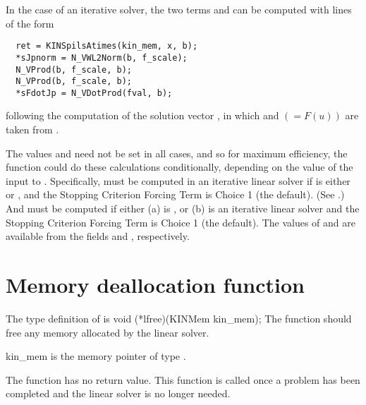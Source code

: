 In the case of an iterative solver, the two terms  and
 can be computed with lines of the form
\vspace{-.1in}
  \begin{verbatim}
  ret = KINSpilsAtimes(kin_mem, x, b);
  *sJpnorm = N_VWL2Norm(b, f_scale);
  N_VProd(b, f_scale, b);
  N_VProd(b, f_scale, b);
  *sFdotJp = N_VDotProd(fval, b);
  \end{verbatim}
\vspace{-.2in}
following the computation of the solution vector , in which
 and  $(= F(u))$ are taken from .

The values  and  need not be set in all cases,
and so for maximum efficiency, the  function could do these
calculations conditionally, depending on the value of the input 
to .  Specifically,  must be computed in an
iterative linear solver if  is either  or
, and the Stopping Criterion Forcing Term is Choice 1
(the default). (See .)  And  must be computed
if either  (a)  is , or (b) 
is an iterative linear solver and the Stopping Criterion Forcing Term
is Choice 1 (the default).  The values of  and 
are available from the  fields 
and , respectively.


\section{Memory deallocation function}
The type definition of  is
{
  void (*lfree)(KINMem kin\_mem);
}
{
  The  function should free any memory allocated by the linear solver.
}
{
  \begin{args}
  \item[kin\_mem]
    is the {\kinsol} memory pointer of type .
  \end{args}
}
{
  The  function has no return value.
}
{
  This function is called once a problem has been completed and the 
  linear solver is no longer needed.
}